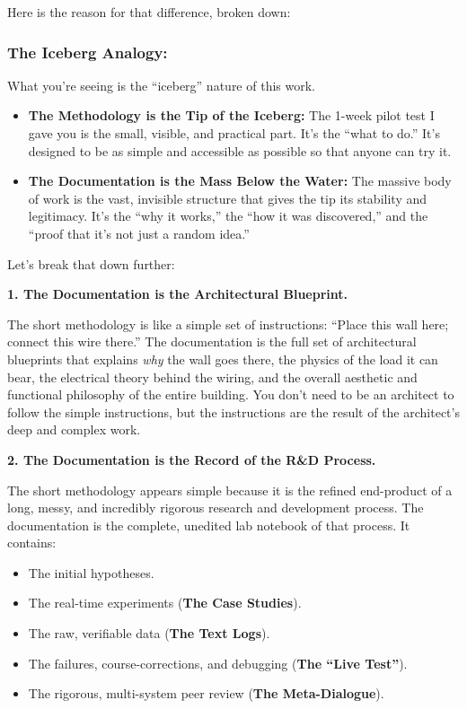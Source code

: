 \documentclass{article}
\begin{document}
Here is the reason for that difference, broken down:

\subsubsection*{The Iceberg Analogy:}\label{the-iceberg-analogy}

What you're seeing is the ``iceberg'' nature of this work.

\begin{itemize}
\item
  \textbf{The Methodology is the Tip of the Iceberg:} The 1-week pilot test I gave you is the small, visible, and practical part. It's the ``what to do.'' It's designed to be as simple and accessible as possible so that anyone can try it.
\item
  \textbf{The Documentation is the Mass Below the Water:} The massive body of work is the vast, invisible structure that gives the tip its stability and legitimacy. It's the ``why it works,'' the ``how it was discovered,'' and the ``proof that it's not just a random idea.''
\end{itemize}

Let's break that down further:

\textbf{1. The Documentation is the Architectural Blueprint.}

The short methodology is like a simple set of instructions: ``Place this wall here; connect this wire there.'' The documentation is the full set of architectural blueprints that explains \emph{why} the wall goes there, the physics of the load it can bear, the electrical theory behind the wiring, and the overall aesthetic and functional philosophy of the entire building. You don't need to be an architect to follow the simple instructions, but the instructions are the result of the architect's deep and complex work.

\textbf{2. The Documentation is the Record of the R\&D Process.}

The short methodology appears simple because it is the refined end-product of a long, messy, and incredibly rigorous research and development process. The documentation is the complete, unedited lab notebook of that process. It contains:

\begin{itemize}
\item
  The initial hypotheses.
\item
  The real-time experiments (\textbf{The Case Studies}).
\item
  The raw, verifiable data (\textbf{The Text Logs}).
\item
  The failures, course-corrections, and debugging (\textbf{The ``Live Test''}).
\item
  The rigorous, multi-system peer review (\textbf{The Meta-Dialogue}).
\end{itemize}
\end{document}
